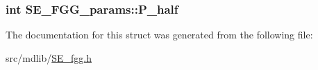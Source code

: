 \hypertarget{structSE__FGG__params_a60d4a6e4fd2d961187c7a91b0b870104}{
\subsubsection[{\-P\-\_\-half}]{\setlength{\rightskip}{0pt plus 5cm}int {\bf \-S\-E\-\_\-\-F\-G\-G\-\_\-params\-::\-P\-\_\-half}}}\label{structSE__FGG__params_a60d4a6e4fd2d961187c7a91b0b870104}


\-The documentation for this struct was generated from the following file\-:\begin{DoxyCompactItemize}
\item 
src/mdlib/\hyperlink{SE__fgg_8h}{\-S\-E\-\_\-fgg.\-h}\end{DoxyCompactItemize}
